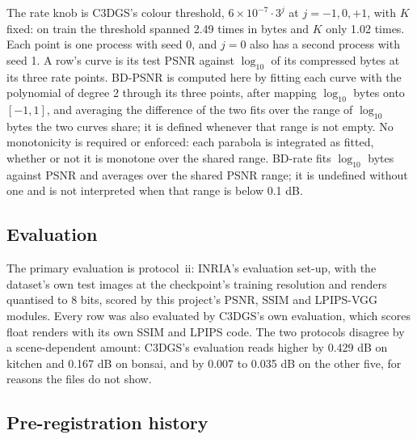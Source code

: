 The rate knob is C3DGS's colour threshold, $6\times10^{-7}\cdot 3^{j}$ at $j = -1, 0, +1$, with $K$ fixed: on train the threshold spanned 2.49 times in bytes and $K$ only 1.02 times. %
Each point is one process with seed 0, and $j = 0$ also has a second process with seed 1. %
A row's curve is its test PSNR against $\log_{10}$ of its compressed  bytes at its three rate points. %
BD-PSNR \citep{barman2022revisiting,barman2024bjontegaard} is computed here by fitting each curve with the polynomial of degree 2 through its three points, after mapping $\log_{10}$ bytes onto $[-1, 1]$, and averaging the difference of the two fits over the range of $\log_{10}$ bytes the two curves share; it is defined whenever that range is not empty. %
No monotonicity is required or enforced: each parabola is integrated as fitted, whether or not it is monotone over the shared range. %
BD-rate fits $\log_{10}$ bytes against PSNR and averages over the shared PSNR range; it is undefined without one and is not interpreted when that range is below 0.1 dB. %

\subsection{Evaluation}

The primary evaluation is protocol~ii: INRIA's evaluation set-up, with the dataset's own test images at the checkpoint's training resolution and renders quantised to 8 bits, scored by this project's PSNR, SSIM and LPIPS-VGG modules. %
Every row was also evaluated by C3DGS's own evaluation, which scores float renders with its own SSIM and LPIPS code. %
The two protocols disagree by a scene-dependent amount: C3DGS's evaluation reads higher by 0.429 dB on kitchen and 0.167 dB on bonsai, and by 0.007 to 0.035 dB on the other five, for reasons the files do not show. %

\subsection{Pre-registration history}

